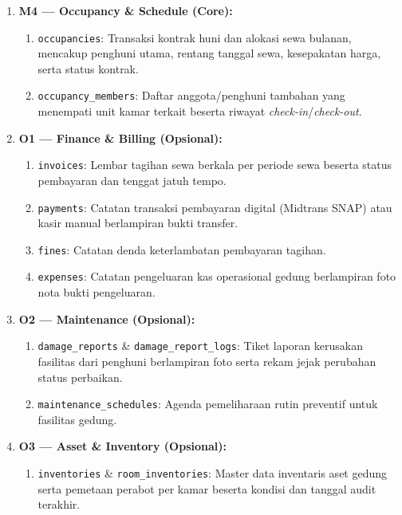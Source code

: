 \begin{enumerate}[label=\arabic*., leftmargin=*]
\begin{enumerate}[label=\alph*., leftmargin=*]
    \end{enumerate}
  \item \textbf{M4 --- Occupancy \& Schedule (Core):}
    \begin{enumerate}[label=\alph*., leftmargin=*]
      \item \texttt{occupancies}: Transaksi kontrak huni dan alokasi sewa bulanan, mencakup penghuni utama, rentang tanggal sewa, kesepakatan harga, serta status kontrak.
      \item \texttt{occupancy\_members}: Daftar anggota/penghuni tambahan yang menempati unit kamar terkait beserta riwayat \textit{check-in}/\textit{check-out}.
    \end{enumerate}
  \item \textbf{O1 --- Finance \& Billing (Opsional):}
    \begin{enumerate}[label=\alph*., leftmargin=*]
      \item \texttt{invoices}: Lembar tagihan sewa berkala per periode sewa beserta status pembayaran dan tenggat jatuh tempo.
      \item \texttt{payments}: Catatan transaksi pembayaran digital (Midtrans SNAP) atau kasir manual berlampiran bukti transfer.
      \item \texttt{fines}: Catatan denda keterlambatan pembayaran tagihan.
      \item \texttt{expenses}: Catatan pengeluaran kas operasional gedung berlampiran foto nota bukti pengeluaran.
    \end{enumerate}
  \item \textbf{O2 --- Maintenance (Opsional):}
    \begin{enumerate}[label=\alph*., leftmargin=*]
      \item \texttt{damage\_reports} \& \texttt{damage\_report\_logs}: Tiket laporan kerusakan fasilitas dari penghuni berlampiran foto serta rekam jejak perubahan status perbaikan.
      \item \texttt{maintenance\_schedules}: Agenda pemeliharaan rutin preventif untuk fasilitas gedung.
    \end{enumerate}
  \item \textbf{O3 --- Asset \& Inventory (Opsional):}
    \begin{enumerate}[label=\alph*., leftmargin=*]
      \item \texttt{inventories} \& \texttt{room\_inventories}: Master data inventaris aset gedung serta pemetaan perabot per kamar beserta kondisi dan tanggal audit terakhir.
    \end{enumerate}

\end{enumerate}
